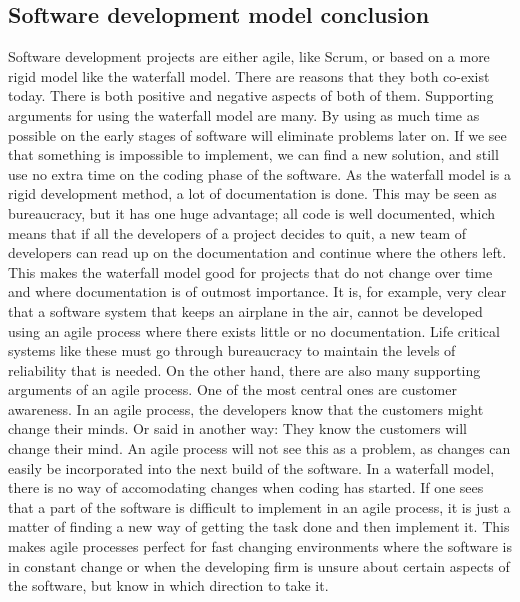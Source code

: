 \subsection{Software development model conclusion}
Software development projects are either agile, like Scrum, or based on a more rigid model like the waterfall model. There are reasons that they both co-exist today. There is both positive and negative aspects of both of them. 
\newline
\newline
Supporting arguments for using the waterfall model are many. By using as much time as possible on the early stages of software will eliminate problems later on. If we see that something is impossible to implement, we can find a new solution, and still use no extra time on the coding phase of the software. 
\newline
\newline
As the waterfall model is a rigid development method, a lot of documentation is done. This may be seen as bureaucracy, but it has one huge advantage; all code is well documented, which means that if all the developers of a project decides to quit, a new team of developers can read up on the documentation and continue where the others left. This makes the waterfall model good for projects that do not change over time and where documentation is of outmost importance. It is, for example, very clear that a software system that keeps an airplane in the air, cannot be developed using an agile process where there exists little or no documentation. Life critical systems like these must go through bureaucracy to maintain the levels of reliability that is needed. 
\newline
\newline
On the other hand, there are also many supporting arguments of an agile process. One of the most central ones are customer awareness. In an agile process, the developers know that the customers might change their minds. Or said in another way: They know the customers will change their mind. An agile process will not see this as a problem, as changes can easily be incorporated into the next build of the software. In a waterfall model, there is no way of accomodating changes when coding has started. If one sees that a part of the software is difficult to implement in an agile process, it is just a matter of finding a new way of getting the task done and then implement it.  This makes agile processes perfect for fast changing environments where the software is in constant change or when the developing firm is unsure about certain aspects of the software, but know in which direction to take it.  
